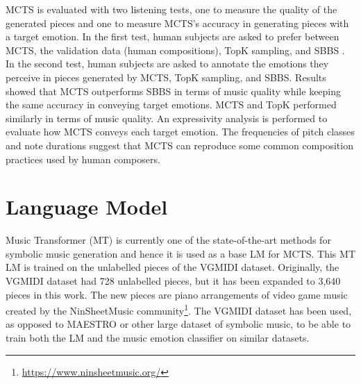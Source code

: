 MCTS is evaluated with two listening tests, one to measure the quality of the generated pieces and one to measure MCTS's accuracy in generating pieces with a target emotion. In the first test, human subjects are asked to prefer between MCTS, the validation data (human compositions), TopK sampling, and SBBS \cite{ferreira2020computer}. In the second test, human subjects are asked to annotate the emotions they perceive in pieces generated by MCTS, TopK sampling, and SBBS. Results showed that MCTS outperforms SBBS in terms of music quality while keeping the same accuracy in conveying target emotions. MCTS and TopK performed similarly in terms of music quality. An expressivity analysis \cite{smith2010analyzing} is performed to evaluate how MCTS conveys each target emotion. The frequencies of pitch classes and note durations suggest that MCTS can reproduce some common composition practices used by human composers.



\section{Language Model}

Music Transformer (MT) \cite{huang2018music} is currently one of the state-of-the-art methods for symbolic music generation and hence it is used as a base LM for MCTS. This MT LM is trained on the unlabelled pieces of the VGMIDI dataset. Originally, the VGMIDI dataset had 728 unlabelled pieces, but it has been expanded to 3,640 pieces in this work. The new pieces are piano arrangements of video game music created by the NinSheetMusic community\footnote{\url{https://www.ninsheetmusic.org/}}. The VGMIDI dataset has been used, as opposed to MAESTRO \cite{hawthorne2018enabling} or other large dataset of symbolic music, to be able to train both the LM and the music emotion classifier on similar datasets.

